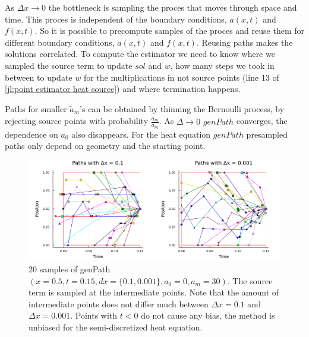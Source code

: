 \documentclass[a4paper,12pt]{article}
\begin{document}
\begin{technique} \label{tech:presampling heat}
  As $\Delta x \rightarrow 0$ the bottleneck is sampling the proces that moves through space and time.
  This proces is independent of the boundary conditions, $a(x,t)$ and $f(x,t)$. So it is possible to
  precompute samples of the proces and reuse them for different boundary conditions, $a(x,t)$ and $f(x,t)$.
  Reusing paths makes the solutions correlated. To compute the estimator we need to know where we sampled the
  source term to update $sol$ and $w$, how many steps we took in between to update $w$ for the
  multiplications in not source points (line 13 of \ref{jl:point estimator heat source})
  and where termination happens.


  Paths for smaller $\tilde{a}_{m}$'s can be obtained by thinning the Bernoulli process,
  by rejecting source points with probability $\frac{\tilde{a}_{m}}{a_{m}}$. As $\Delta \rightarrow 0$
  $genPath$ converges, the dependence on $a_{0}$ also disappears. For the heat equation
  $genPath$ presampled paths only depend on geometry and the starting point.

  \begin{figure}[h!]
    \centering
    \includegraphics[width=\textwidth]{./julia_plots/paths_pest_heat_varcoef.pdf}
    \caption{$20$ samples of genPath$(x=0.5,t=0.15,dx=\{0.1,0.001\},a_{0}=0,a_{m} = 30)$. The source term is sampled
    at the intermediate points. Note that the amount of
    intermediate points does not differ much between $\Delta x = 0.1$ and $\Delta x = 0.001$.
    Points with $t<0$ do not cause any bias, the method is unbiased for the semi-discretized heat equation. }
    \label{fig:presampled paths pest heat var}
  \end{figure}

\end{technique}
\end{document}
